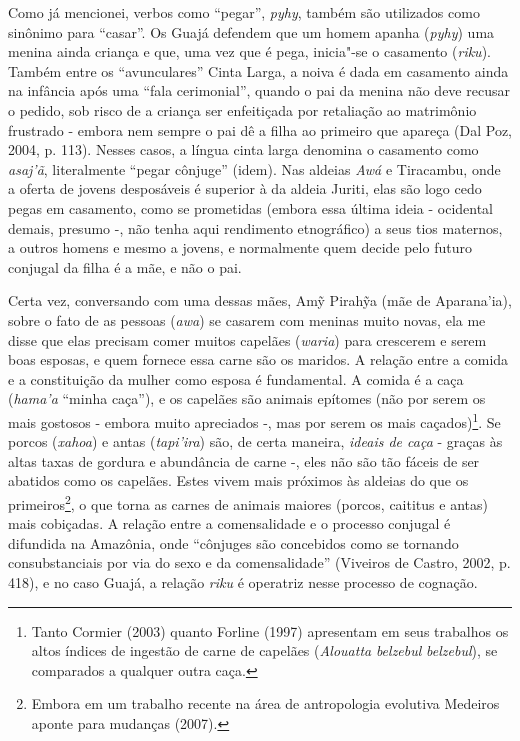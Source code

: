 Como já mencionei, verbos como ``pegar'', \emph{pyhy}, também são
utilizados como sinônimo para ``casar''. Os Guajá defendem que um homem
apanha (\emph{pyhy}) uma menina ainda criança e que, uma vez que é pega,
inicia"-se o casamento (\emph{riku}). Também entre os ``avunculares''
Cinta Larga, a noiva é dada em casamento ainda na infância após uma
``fala cerimonial'', quando o pai da menina não deve recusar o pedido, sob
risco de a criança ser enfeitiçada por retaliação ao matrimônio
frustrado - embora nem sempre o pai dê a filha ao primeiro que apareça
(Dal Poz, 2004, p. 113). Nesses casos, a língua cinta larga denomina o
casamento como \emph{asaj'ã}, literalmente ``pegar cônjuge'' (idem). Nas
aldeias \emph{Awá} e Tiracambu, onde a oferta de jovens desposáveis é
superior à da aldeia Juriti, elas são logo cedo pegas em casamento, como
se prometidas (embora essa última ideia - ocidental demais, presumo -,
não tenha aqui rendimento etnográfico) a seus tios maternos, a outros
homens e mesmo a jovens, e normalmente quem decide pelo futuro conjugal
da filha é a mãe, e não o pai.

Certa vez, conversando com uma dessas mães, Amỹ Pirahỹa (mãe de
Aparana'ia), sobre o fato de as pessoas (\emph{awa}) se casarem com
meninas muito novas, ela me disse que elas precisam comer muitos
capelães (\emph{waria}) para crescerem e serem boas esposas, e quem
fornece essa carne são os maridos. A relação entre a comida e a
constituição da mulher como esposa é fundamental. A comida é a caça
(\emph{hama'a} ``minha caça''), e os capelães são animais epítomes (não
por serem os mais gostosos - embora muito apreciados -, mas por serem os
mais caçados)\footnote{Tanto Cormier (2003) quanto Forline (1997)
  apresentam em seus trabalhos os altos índices de ingestão de carne de
  capelães (\emph{Alouatta} \emph{belzebul} \emph{belzebul}), se
  comparados a qualquer outra caça.}. Se porcos (\emph{xahoa}) e antas
(\emph{tapi'ira}) são, de certa maneira, \emph{ideais de caça} - graças
às altas taxas de gordura e abundância de carne -, eles não são tão
fáceis de ser abatidos como os capelães. Estes vivem mais próximos às
aldeias do que os primeiros\footnote{Embora em um trabalho recente na
  área de antropologia evolutiva Medeiros aponte para mudanças (2007).},
o que torna as carnes de animais maiores (porcos, caititus e antas) mais
cobiçadas. A relação entre a comensalidade e o processo conjugal é
difundida na Amazônia, onde ``cônjuges são concebidos como se tornando
consubstanciais por via do sexo e da comensalidade'' (Viveiros de Castro,
2002, p. 418), e no caso Guajá, a relação \emph{riku} é operatriz nesse
processo de cognação.

